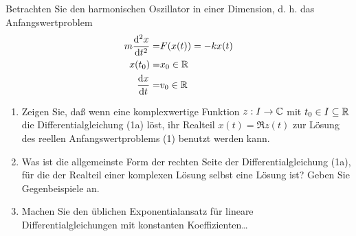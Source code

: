 \begin{Problem}
	Betrachten Sie den harmonischen Oszillator in einer Dimension, d. h. das Anfangswertproblem
	\begin{align*}
		m\dv[2]{x}{t}(t)=&F(x(t))=-kx(t)\\
		x(t_0)=&x_0\in \mathbb{R}\\
		\dv{x}{t}(t_0)=&v_0\in \mathbb{R}
	\end{align*}
\begin{enumerate}
	\item Zeigen Sie, daß wenn eine komplexwertige Funktion $z : I \to \mathbb{C}$ mit $t_0 \in I \subseteq \mathbb{R}$ die Differentialgleichung (1a) löst, ihr Realteil $x(t) = \Re z(t)$ zur Lösung des reellen Anfangswertproblems (1) benutzt werden kann.
	\item Was ist die allgemeinste Form der rechten Seite der Differentialgleichung (1a), für die der Realteil einer komplexen Lösung selbst eine Lösung ist? Geben Sie Gegenbeispiele an.
	\item Machen Sie den üblichen Exponentialansatz für lineare Differentialgleichungen mit konstanten Koeffizienten\ldots 
\end{enumerate}
\end{Problem}
